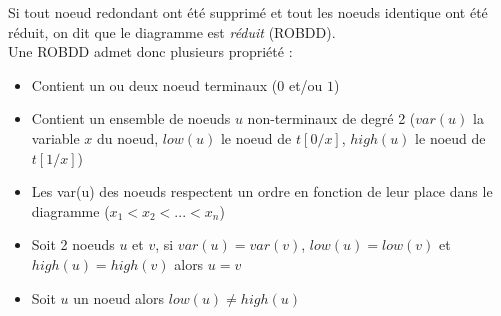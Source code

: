 \documentclass[a4paper, oneside]{report}
\begin{document}
Si tout noeud redondant ont été supprimé et tout les noeuds identique ont été réduit, on dit que le diagramme est \textit{réduit} (ROBDD).\\

Une ROBDD admet donc plusieurs propriété :

\begin{itemize}
\item Contient un ou deux noeud terminaux ($0$ et/ou $1$)
\item Contient un ensemble de noeuds $u$ non-terminaux de degré 2 ($var(u)$ la variable $x$ du noeud, $low(u)$ le noeud de $t[0/x]$, $high(u)$ le noeud de $t[1/x]$)
\item Les var(u) des noeuds respectent un ordre en fonction de leur place dans le diagramme ($x_1 < x_2 < ... < x_n$)
\item Soit 2 noeuds $u$ et $v$, si $var(u) = var(v)$, $low(u) = low(v)$ et $high(u) = high(v)$ alors $u = v$
\item Soit $u$ un noeud alors $low(u) \neq high(u)$
\end{itemize}
\end{document}
